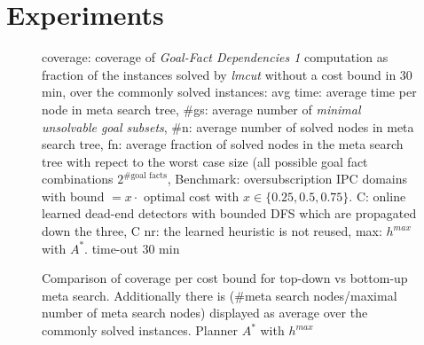 


\newcommand{\scatterplotsize}{8cm}
\newcommand{\scatterplotxlabelshift}{1.5ex}
\newcommand{\scatterplotylabelshift}{-3ex}

\section{Experiments}





\setlength{\tabcolsep}{1pt}
\renewcommand{\arraystretch}{0.8}
\begin{figure}[ht]
	\centering
	
	\caption{
		coverage: coverage of \emph{Goal-Fact Dependencies 1} computation as fraction of the instances solved by \emph{lmcut} without a cost bound in 30 min, 
		over the commonly solved instances:
		avg time: average time per node in meta search tree,
		\#gs: average number of \emph{minimal unsolvable goal subsets},
		\#n: average number of solved nodes in meta search tree,
		fn: average fraction of solved nodes in the meta search tree with repect to the worst case size (all possible goal fact combinations $2^{\text{\# goal facts}}$, 
		Benchmark: oversubscription IPC 
		domains with bound $ = x \cdot $ optimal cost with $ x \in \{0.25, 0.5, 0.75\}$.
		C: online learned dead-end detectors with bounded DFS which are propagated 
		down the three, C nr: the learned heuristic is not reused, max: $h^{max}$ with $A^*$. 
		time-out 30 min}
\end{figure}



\begin{figure}[ht]
	\small
	\centering
	
	\caption{Comparison of coverage per cost bound for top-down vs bottom-up meta search.
	Additionally there is (\#meta search nodes/maximal number of meta search nodes) displayed as average over the commonly solved instances.
	Planner $A^*$ with $h^{max}$}
\end{figure}



